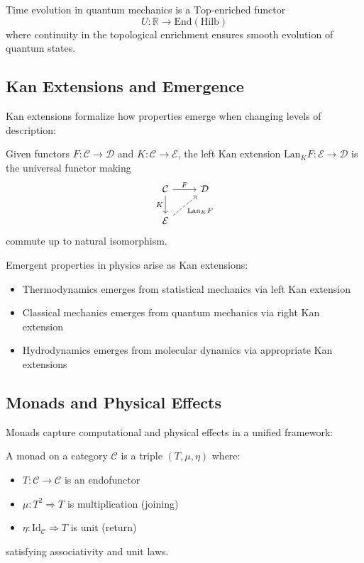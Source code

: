 \begin{example}
Time evolution in quantum mechanics is a $\text{Top}$-enriched functor
\[
U: \mathbb{R} \to \text{End}(\text{Hilb})
\]
where continuity in the topological enrichment ensures smooth evolution of quantum states.
\end{example}

\subsection{Kan Extensions and Emergence}

Kan extensions formalize how properties emerge when changing levels of description:

\begin{definition}
Given functors $F: \mathcal{C} \to \mathcal{D}$ and $K: \mathcal{C} \to \mathcal{E}$, the left Kan extension $\text{Lan}_K F: \mathcal{E} \to \mathcal{D}$ is the universal functor making
\[
\begin{tikzcd}
\mathcal{C} \arrow[r, "F"] \arrow[d, "K"'] & \mathcal{D} \\
\mathcal{E} \arrow[ur, "\text{Lan}_K F"', dashed]
\end{tikzcd}
\]
commute up to natural isomorphism.
\end{definition}

\begin{proposition}
Emergent properties in physics arise as Kan extensions:
\begin{itemize}
\item Thermodynamics emerges from statistical mechanics via left Kan extension
\item Classical mechanics emerges from quantum mechanics via right Kan extension
\item Hydrodynamics emerges from molecular dynamics via appropriate Kan extensions
\end{itemize}
\end{proposition}

\subsection{Monads and Physical Effects}

Monads capture computational and physical effects in a unified framework:

\begin{definition}[Monad]
A monad on a category $\mathcal{C}$ is a triple $(T, \mu, \eta)$ where:
\begin{itemize}
\item $T: \mathcal{C} \to \mathcal{C}$ is an endofunctor
\item $\mu: T^2 \Rightarrow T$ is multiplication (joining)
\item $\eta: \text{Id}_{\mathcal{C}} \Rightarrow T$ is unit (return)
\end{itemize}
satisfying associativity and unit laws.
\end{definition}


